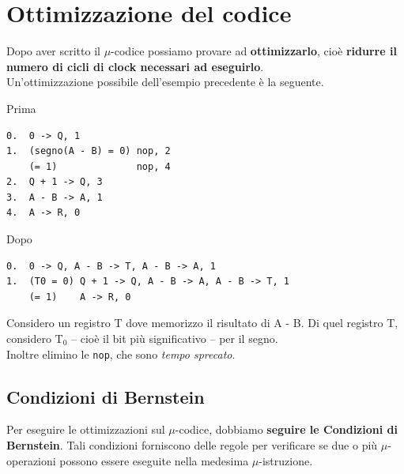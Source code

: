 \documentclass[10pt]{report}
\begin{document}
\section{Ottimizzazione del codice}
Dopo aver scritto il $\mu$-codice possiamo provare ad \textbf{ottimizzarlo}, cioè \textbf{ridurre il numero di cicli di clock necessari ad eseguirlo}.\\
Un'ottimizzazione possibile dell'esempio precedente è la seguente.
\begin{multicols}{2}
\begin{center}
Prima
\begin{verbatim}
0.  0 -> Q, 1
1.  (segno(A - B) = 0) nop, 2
    (= 1)              nop, 4
2.  Q + 1 -> Q, 3
3.  A - B -> A, 1
4.  A -> R, 0
\end{verbatim}
\end{center}
\columnbreak
\begin{center}
Dopo
\begin{verbatim}
0.  0 -> Q, A - B -> T, A - B -> A, 1
1.  (T0 = 0) Q + 1 -> Q, A - B -> A, A - B -> T, 1
    (= 1)    A -> R, 0
\end{verbatim}
\end{center}
\end{multicols}
Considero un registro T dove memorizzo il risultato di A - B. Di quel registro T, considero T$_0$ -- cioè il bit più significativo -- per il segno.\\
Inoltre elimino le \texttt{nop}, che sono \textit{tempo sprecato}.
\subsection{Condizioni di Bernstein}
Per eseguire le ottimizzazioni sul $\mu$-codice, dobbiamo \textbf{seguire le Condizioni di Bernstein}. Tali condizioni forniscono delle regole per verificare se due o più $\mu$-operazioni possono essere eseguite nella medesima $\mu$-istruzione.
\end{document}
